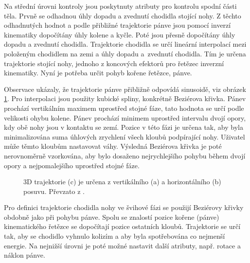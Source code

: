 Na střední úrovni kontroly jsou poskytnuty atributy pro kontrolu spodní části těla. Prvně se odhadnou úhly dopadu a zvednutí chodidla stojící nohy. Z těchto odhadnutých hodnot a podle přibližné trajektorie pánve jsou pomocí inverzí kinematiky dopočítány úhly kolene a kyčle. Poté jsou přesně dopočítány úhly dopadu a zvednutí chodidla. Trajektorie chodidla se určí lineární interpolací mezi položeným chodidlem na zemi a úhly dopadu a~zvednutí chodidla. Tím je určena trajektorie stojící nohy, jednoho z koncových efektorů pro řetězec inverzní kinematiky. Nyní je potřeba určit pohyb kořene řetězce, pánve. 

Observace ukázaly, že trajektorie pánve přibližně odpovídá sinusoidě, viz obrázek \ref{chung_pelvis}. Pro interpolaci jsou použity kubické spliny, konkrétně Beziérova křivka. Pánev prochází vertikálním maximem uprostřed stojné fáze, tato hodnota se určí podle velikosti ohybu kolene. Pánev prochází minimem uprostřed intervalu dvojí opory, kdy obě nohy jsou v kontaktu se zemí. Pozice v této fázi je určena tak, aby byla minimalizována suma úhlových zrychlení všech kloubů podpírající nohy. Uživatel může těmto kloubům nastavovat váhy. Výsledná Beziérova křivka je poté nerovnoměrně vzorkována, aby bylo dosaženo nejrychlejšího pohybu během dvojí opory a nejpomalejšího uprostřed stojné fáze. 
\begin{figure}[h]
\begin{center}
\caption{3D trajektorie (c) je určena z vertikálního (a) a horizontálního (b) posuvu. Převzato z \cite{chung}.} \label{chung_pelvis}
\end{center}
\end{figure}
Pro definici trajektorie chodidla nohy ve švihové fázi se použijí Beziérovy křivky obdobně jako při pohybu pánve. Spolu se znalostí pozice kořene (pánve) kinematického řetězce se dopočítají pozice ostatních kloubů. Trajektorie se určí tak, aby se chodidlo vyhnulo kolizím a aby byla spotřebována co nejmenší energie. Na nejnižší úrovni je poté možné nastavit další atributy, např. rotace a náklon pánve.


